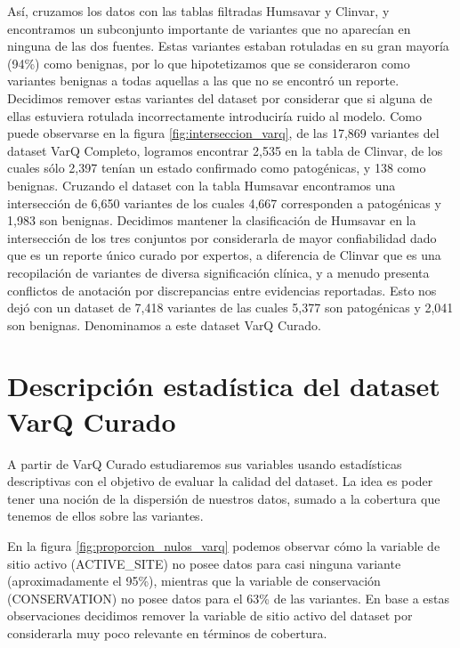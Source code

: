 Así, cruzamos los datos con las tablas filtradas Humsavar y Clinvar, y encontramos un subconjunto importante de variantes que no aparecían en ninguna de las dos fuentes. Estas variantes estaban rotuladas en su gran mayoría (94\%) como benignas, por lo que hipotetizamos que se consideraron como variantes benignas a todas aquellas a las que no se encontró un reporte. Decidimos remover estas variantes del dataset por considerar que si alguna de ellas estuviera rotulada incorrectamente introduciría ruido al modelo. Como puede observarse en la figura \ref{fig:interseccion_varq}, de las 17,869 variantes del dataset VarQ Completo, logramos encontrar 2,535 en la tabla de Clinvar, de los cuales sólo 2,397 tenían un estado confirmado como patogénicas, y 138 como benignas. Cruzando el dataset con la tabla Humsavar encontramos una intersección de 6,650 variantes de los cuales 4,667 corresponden a patogénicas y 1,983 son benignas. Decidimos mantener la clasificación de Humsavar en la intersección de los tres conjuntos por considerarla de mayor confiabilidad dado que es un reporte único curado por expertos, a diferencia de Clinvar que es una recopilación de variantes de diversa significación clínica, y a menudo presenta conflictos de anotación por discrepancias entre evidencias reportadas. Esto nos dejó con un dataset de 7,418 variantes de las cuales 5,377 son patogénicas y 2,041 son benignas. Denominamos a este dataset VarQ Curado. 


\section{Descripción estadística del dataset VarQ Curado}

A partir de VarQ Curado estudiaremos sus variables usando estadísticas descriptivas con el objetivo de evaluar la calidad del dataset. La idea es poder tener una noción de la dispersión de nuestros datos, sumado a la cobertura que tenemos de ellos sobre las variantes.

En la figura \ref{fig:proporcion_nulos_varq} podemos observar cómo la variable de sitio activo (ACTIVE\_SITE) no posee datos para casi ninguna variante (aproximadamente el 95\%), mientras que la variable de conservación (CONSERVATION) no posee datos para el 63\% de las variantes. En base a estas observaciones decidimos remover la variable de sitio activo del dataset por considerarla muy poco relevante en términos de cobertura.

